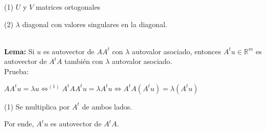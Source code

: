 (1) $U$ y $V$ matrices ortogonales

(2) $\lambda$ diagonal con valores singulares en la diagonal.

\ \\
\textbf{Lema:} Si $u$ es autovector de $A A^t$ con $\lambda$ autovalor asociado, entonces $A^t u \in
\mathbb{R}^m$ es autovector de $A^t A$ también con $\lambda$ autovalor asociado.
\ \\
Prueba:
\begin{center}
  $A A^t u = \lambda u \iff^{(1)} A^t A A^t u = \lambda A^t u \iff A^t A (A^t u) = \lambda (A^t u)$
\end{center}
(1) Se multiplica por $A^t$ de ambos lados.

Por ende, $A^t u$ es autovector de $A^t A$.


